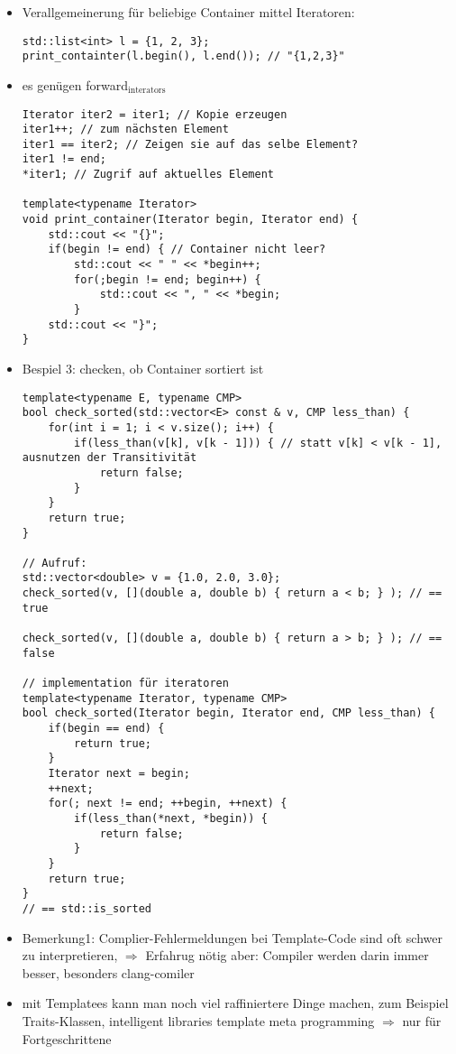 \documentclass[a4paper]{scrartcl}
\begin{document}
$$\begin{itemize}
\begin{enumerate}
\begin{itemize}
\begin{itemize}
\begin{verbatim}
		for(int i = 1; i < v.size(); i++) {
			std::cout << ", " << v[i];
		}
	}
	std::cout << " }";
}
\end{verbatim}
\item Verallgemeinerung für beliebige Container mittel Iteratoren:
\begin{verbatim}
std::list<int> l = {1, 2, 3};
print_containter(l.begin(), l.end()); // "{1,2,3}"
\end{verbatim}
\item es genügen forward$_{\text{interators}}$
\begin{verbatim}
Iterator iter2 = iter1; // Kopie erzeugen
iter1++; // zum nächsten Element
iter1 == iter2; // Zeigen sie auf das selbe Element?
iter1 != end;
*iter1; // Zugrif auf aktuelles Element

template<typename Iterator>
void print_container(Iterator begin, Iterator end) {
	std::cout << "{}";
	if(begin != end) { // Container nicht leer?
		std::cout << " " << *begin++;
		for(;begin != end; begin++) {
			std::cout << ", " << *begin;
		}
	std::cout << "}";
}
\end{verbatim}
\item Bespiel 3: checken, ob Container sortiert ist
\begin{verbatim}
template<typename E, typename CMP>
bool check_sorted(std::vector<E> const & v, CMP less_than) {
	for(int i = 1; i < v.size(); i++) {
		if(less_than(v[k], v[k - 1])) { // statt v[k] < v[k - 1], ausnutzen der Transitivität
			return false;
		}
	}
	return true;
}

// Aufruf:
std::vector<double> v = {1.0, 2.0, 3.0};
check_sorted(v, [](double a, double b) { return a < b; } ); // == true

check_sorted(v, [](double a, double b) { return a > b; } ); // == false

// implementation für iteratoren
template<typename Iterator, typename CMP>
bool check_sorted(Iterator begin, Iterator end, CMP less_than) {
	if(begin == end) {
		return true;
	}
	Iterator next = begin;
	++next;
	for(; next != end; ++begin, ++next) {
		if(less_than(*next, *begin)) {
			return false;
		}
	}
	return true;
}
// == std::is_sorted
\end{verbatim}
\item Bemerkung1: Complier-Fehlermeldungen bei Template-Code sind oft schwer zu interpretieren, $\Rightarrow$ Erfahrug nötig aber: Compiler werden darin immer besser, besonders clang-comiler
\item mit Templatees kann man noch viel raffiniertere Dinge machen, zum Beispiel Traits-Klassen, intelligent libraries template meta programming $\Rightarrow$ nur für Fortgeschrittene
\end{itemize}
\end{itemize}
\end{enumerate}
\end{itemize}
\end{document}

